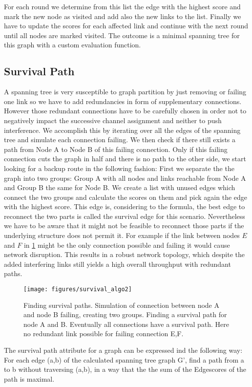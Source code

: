   For each round we determine from this list the edge with the highest score and mark the new node as visited and add also the new links to the list.
  Finally we have to update the scores for each affected link and continue with the next round until all nodes are marked visited.
  The outcome is a minimal spanning tree for this graph with a custom evaluation function.
  \subsection{Survival Path}
  A spanning tree is very susceptible to graph partition by just removing or failing one link so we have to add redundancies in form of supplementary connections.
  However those redundant connections have to be carefully chosen in order not to negatively impact the successive channel assignment and neither to push interference.
  We accomplish this by iterating over all the edges of the spanning tree and simulate each connection failing. We then check if there still exists 
  a path from Node A to Node B of this failing connection. Only if this failing connection cuts the graph in half and there is no path to the other side,
  we start looking for a backup route in the following fashion:
  First we separate the the graph into two groups: Group A with all nodes and links reachable from Node A and Group B the same for Node B.
  We create a list with unused edges which connect the two groups and calculate the scores on them and pick again the edge with the highest score.
  This edge is, considering to the formula, the best edge to reconnect the two parts is called the survival edge for this scenario.
  Nevertheless we have to be aware that it might not be feasible to reconnect those parts if the underlying structure does not permit it.
  For example if the link between nodes \(E\) and \(F\) in \ref{fig:survival_algo} might be the only connection possible and failing it would cause network disruption.
  This results in a robust network topology, which despite the added interfering links still yields a high overall throughput with redundant paths.
  \begin{figure}[h]
    \centering
    \texttt{[image: figures/survival\_algo2]}
    \caption{Finding survival paths. Simulation of connection between node A and node B failing, creating two groups.
    Finding a survival path for node A and B. Eventually all connections have a survival path. Here no redundant link possible for failing connection E,F.}
    \label{fig:survival_algo}
  \end{figure}
  The survival path attribute for a graph can be expressed ind the following way:
  For each edge (a,b) of the calculated spanning tree graph G', find a path from a to b without traversing (a,b), 
  in a way that the the sum of the Edgescores of the path is maximal.

